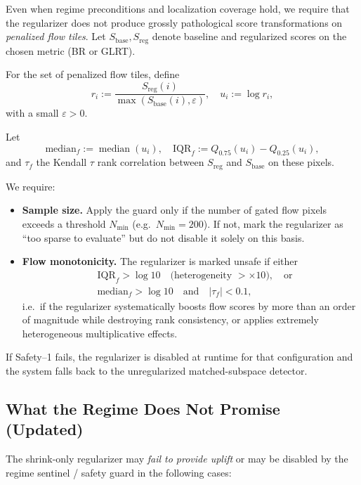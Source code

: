 Even when regime preconditions and localization coverage hold, we require that the regularizer does not produce grossly pathological score transformations on \emph{penalized flow tiles}. Let $S_{\text{base}},S_{\text{reg}}$ denote baseline and regularized scores on the chosen metric (BR or GLRT).

For the set of penalized flow tiles, define
\[
r_i := \frac{S_{\text{reg}}(i)}{\max(S_{\text{base}}(i),\varepsilon)},\quad
u_i := \log r_i,
\]
with a small $\varepsilon>0$.

Let
\[
\mathrm{median}_f := \operatorname{median}(u_i),\quad
\mathrm{IQR}_f := Q_{0.75}(u_i) - Q_{0.25}(u_i),
\]
and $\tau_f$ the Kendall $\tau$ rank correlation between $S_{\text{reg}}$ and $S_{\text{base}}$ on these pixels.

We require:
\begin{itemize}[nosep]
  \item \textbf{Sample size.} Apply the guard only if the number of gated flow pixels exceeds a threshold $N_{\min}$ (e.g.\ $N_{\min}=200$). If not, mark the regularizer as ``too sparse to evaluate'' but do not disable it solely on this basis.
  \item \textbf{Flow monotonicity.} The regularizer is marked unsafe if either
  \begin{align*}
    &\mathrm{IQR}_f > \log 10\quad\text{(heterogeneity }>\times10\text{)},\quad\text{or}\\
    &\mathrm{median}_f > \log 10\quad\text{and}\quad |\tau_f| < 0.1,
  \end{align*}
  i.e.\ if the regularizer systematically boosts flow scores by more than an order of magnitude while destroying rank consistency, or applies extremely heterogeneous multiplicative effects.
\end{itemize}

If Safety--1 fails, the regularizer is disabled at runtime for that configuration and the system falls back to the unregularized matched-subspace detector.

\subsection{What the Regime Does Not Promise (Updated)}

The shrink-only regularizer may \emph{fail to provide uplift} or may be disabled by the regime sentinel / safety guard in the following cases:

